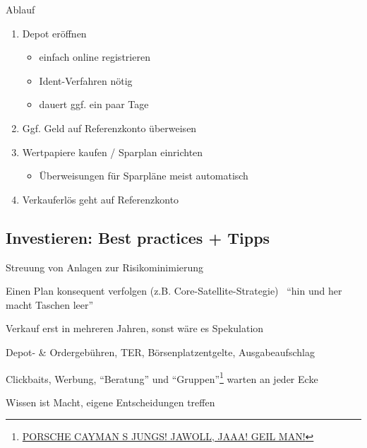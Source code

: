 \documentclass{beamer}
\begin{document}
			\begin{frame}{Ablauf}
				\begin{enumerate}
					\item Depot eröffnen
					\begin{itemize}
						\item einfach online registrieren
						\item Ident-Verfahren nötig
						\item dauert ggf. ein paar Tage
					\end{itemize}
					\item Ggf. Geld auf Referenzkonto überweisen
					\item Wertpapiere kaufen / Sparplan einrichten
					\begin{itemize}
						\item Überweisungen für Sparpläne meist automatisch
					\end{itemize}
					\item Verkauferlös geht auf Referenzkonto
				\end{enumerate}
			\end{frame}
		
		\subsection{Investieren: Best practices + Tipps}
		
			\begin{frame}
				\begin{description}[labelwidth=0cm]
					\item[Diversifikation] Streuung von Anlagen zur Risikominimierung\pause
					\item[Strategie] Einen Plan konsequent verfolgen (z.B. Core-Satellite-Strategie) \textrightarrow\  "`hin und her macht Taschen leer"'\pause
					\item[Geduld] Verkauf erst in mehreren Jahren, sonst wäre es Spekulation\pause
					\item[Gebühren] Depot- \& Ordergebühren, TER, Börsenplatzentgelte, Ausgabeaufschlag\pause
					\item[Nachdenken] Clickbaits, Werbung, "`Beratung"' und "`Gruppen"'\footnote{\href{https://www.youtube.com/watch?v=dM-8-KuKprA}{PORSCHE CAYMAN S JUNGS! JAWOLL, JAAA! GEIL MAN!}} warten an jeder Ecke\pause
					\item[Bildung] Wissen ist Macht, eigene Entscheidungen treffen
				\end{description}
			\end{frame}
		
\end{document}
